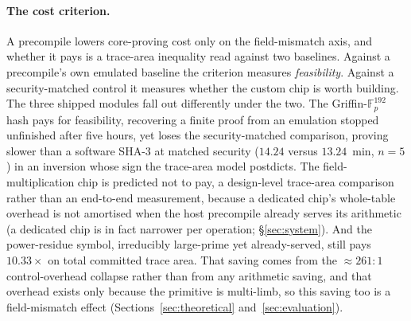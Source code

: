 \paragraph{The cost criterion.}
A precompile lowers core-proving cost only on the field-mismatch axis, and whether it pays is a trace-area inequality read against two baselines. Against a precompile's own emulated baseline the criterion measures \emph{feasibility}. Against a security-matched control it measures whether the custom chip is worth building. The three shipped modules fall out differently under the two. The Griffin-$\mathbb{F}_p^{192}$ hash pays for feasibility, recovering a finite proof from an emulation stopped unfinished after five hours, yet loses the security-matched comparison, proving slower than a software SHA-3 at matched security ($14.24$ versus $13.24$~min, $n=5$) in an inversion whose sign the trace-area model postdicts. The field-multiplication chip is predicted not to pay, a design-level trace-area comparison rather than an end-to-end measurement, because a dedicated chip's whole-table overhead is not amortised when the host precompile already serves its arithmetic (a dedicated chip is in fact narrower per operation; \S\ref{sec:system}). And the power-residue symbol, irreducibly large-prime yet already-served, still pays $10.33\times$ on total committed trace area. That saving comes from the ${\approx}261{:}1$ control-overhead collapse rather than from any arithmetic saving, and that overhead exists only because the primitive is multi-limb, so this saving too is a field-mismatch effect (Sections~\ref{sec:theoretical} and~\ref{sec:evaluation}).

